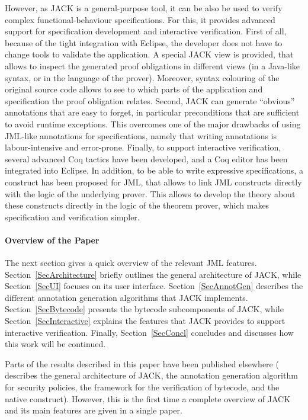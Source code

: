 However, as JACK is a general-purpose tool, it can be also be used to
verify complex functional-behaviour specifications. For this, it
provides advanced support for specification development and
interactive verification. First of all, because of the tight
integration with Eclipse, the developer does not have to change tools
to validate the application. A special JACK view is provided, that
allows to inspect the generated proof obligations in different views
(in a Java-like syntax, or in the language of the prover). Moreover,
syntax colouring of the original source code allows to see to which
parts of the application and specification the proof obligation
relates. Second, JACK can generate ``obvious'' annotations that are
easy to forget, in particular preconditions that are sufficient to
avoid runtime exceptions. This overcomes one of the major drawbacks of
using JML-like annotations for specifications, namely that writing
annotations is labour-intensive and error-prone. Finally, to support
interactive verification, several advanced Coq tactics have been
developed, and a Coq editor has been integrated into Eclipse. In
addition, to be able to write expressive specifications, a
\native construct has been proposed for JML, that allows to
link JML constructs directly with the logic of the underlying
prover. This allows to develop the theory about these constructs
directly in the logic of the theorem prover, which makes specification
and verification simpler.


\paragraph{Overview of the Paper}
The next section gives a quick overview of the relevant JML features.
Section~\ref{SecArchitecture} briefly outlines the general
architecture of JACK, while Section~\ref{SecUI} focuses on its user
interface. Section~\ref{SecAnnotGen} describes the different
annotation generation algorithms that JACK
implements. Section~\ref{SecBytecode} presents the bytecode
subcomponents of JACK, while Section~\ref{SecInteractive} explains the
features that JACK provides to support interactive
verification. Finally, Section~\ref{SecConcl} concludes and discusses
how this work will be continued.

Parts of the results described in this paper have been published
elsewhere (\cite{BurdyRL03} describes the general architecture of
JACK, \cite{PavlovaBBHL04} the annotation generation algorithm
for security policies, \cite{BurdyP06} the framework for the
verification of bytecode, and \cite{Charles06} the native
construct). However, this is the first time a complete overview of
JACK and its main features are given in a single paper.


